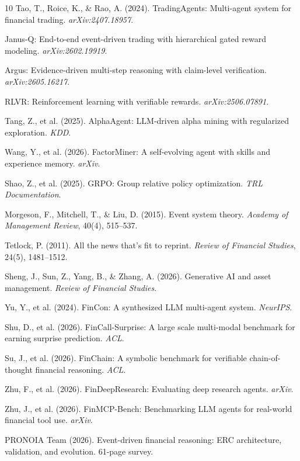 \documentclass[sigconf, anonymous, review]{acmart}
\begin{document}
\begin{thebibliography}{10}
Tao, T., Roice, K., \& Rao, A. (2024). TradingAgents: Multi-agent system for financial trading. \emph{arXiv:2407.18957}.

Janus-Q: End-to-end event-driven trading with hierarchical gated reward modeling. \emph{arXiv:2602.19919}.

Argus: Evidence-driven multi-step reasoning with claim-level verification. \emph{arXiv:2605.16217}.

RLVR: Reinforcement learning with verifiable rewards. \emph{arXiv:2506.07891}.

Tang, Z., et al. (2025). AlphaAgent: LLM-driven alpha mining with regularized exploration. \emph{KDD}.

Wang, Y., et al. (2026). FactorMiner: A self-evolving agent with skills and experience memory. \emph{arXiv}.

Shao, Z., et al. (2025). GRPO: Group relative policy optimization. \emph{TRL Documentation}.

Morgeson, F., Mitchell, T., \& Liu, D. (2015). Event system theory. \emph{Academy of Management Review}, 40(4), 515--537.

Tetlock, P. (2011). All the news that's fit to reprint. \emph{Review of Financial Studies}, 24(5), 1481--1512.

Sheng, J., Sun, Z., Yang, B., \& Zhang, A. (2026). Generative AI and asset management. \emph{Review of Financial Studies}.

Yu, Y., et al. (2024). FinCon: A synthesized LLM multi-agent system. \emph{NeurIPS}.

Shu, D., et al. (2026). FinCall-Surprise: A large scale multi-modal benchmark for earning surprise prediction. \emph{ACL}.

Su, J., et al. (2026). FinChain: A symbolic benchmark for verifiable chain-of-thought financial reasoning. \emph{ACL}.

Zhu, F., et al. (2026). FinDeepResearch: Evaluating deep research agents. \emph{arXiv}.

Zhu, J., et al. (2026). FinMCP-Bench: Benchmarking LLM agents for real-world financial tool use. \emph{arXiv}.

PRONOIA Team (2026). Event-driven financial reasoning: ERC architecture, validation, and evolution. 61-page survey.


\end{thebibliography}
\end{document}
